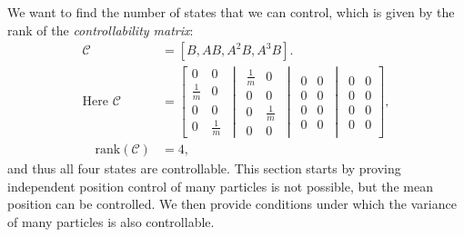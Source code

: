 We want to find the number of states that we can control, which is given by the rank of the \emph{controllability matrix}:
\begin{align}
\mathcal{C} &= [ B, AB, A^2B, A^{3}B ].\\
\textrm{Here }
\mathcal{C}&=\left[
\begin{matrix} 
0 & 0\\
\frac{1}{m} & 0 \\
0 & 0 \\
0 & \frac{1}{m}
\end{matrix}
\,\middle\vert\,
\begin{matrix} 
\frac{1}{m}& 0\\
0 & 0\\
0 & \frac{1}{m}\\
0 & 0
\end{matrix}
\,\middle\vert\,
\begin{matrix} 
0 & 0\\
0 & 0 \\
0 & 0 \\
0 & 0
\end{matrix}
\,\middle\vert\,
\begin{matrix} 
0 & 0\\
0 & 0\\
0 & 0\\
0 & 0
\end{matrix}
 \right],\\
 \quad \textrm{rank}(\mathcal{C})&=4,
\end{align}
and thus all four states are controllable. This section starts by proving independent position control of many particles is not possible, but the mean position can be controlled. We then provide conditions under which the variance of many particles is also controllable.

